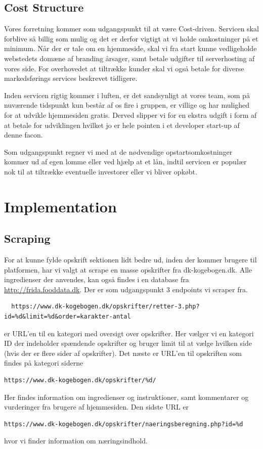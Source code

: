 \documentclass[a4paper,]{article}
\begin{document}
\subsection{Cost Structure}
Vores forretning kommer som udgangspunkt til at være Cost-driven. Servicen skal forblive så billig som mulig og det er derfor vigtigt at vi holde omkostninger på et minimum. Når der er tale om en hjemmeside, skal vi fra start kunne vedligeholde webstedets domæne af branding årsager, samt betale udgifter til serverhosting af vores side. For overhovedet at tiltrække kunder skal vi også betale for diverse markedsførings services beskrevet tidligere. 

Inden servicen rigtig kommer i luften, er det sandsynligt at vores team, som på nuværende tidspunkt kun består af os fire i gruppen, er villige og har mulighed for at udvikle hjemmesiden gratis. Derved slipper vi for en ekstra udgift i form af at betale for udviklingen hvilket jo er hele pointen i et developer start-up af denne facon. 

Som udgangspunkt regner vi med at de nødvendige opstartsomkostninger kommer ud af egen lomme eller ved hjælp at et lån, indtil servicen er populær nok til at tiltrække eventuelle investorer eller vi bliver opkøbt. 


\newpage
\section{Implementation}

\subsection{Scraping}
For at kunne fylde opskrift sektionen lidt bedre ud, inden der kommer
brugere til platformen, har vi valgt at scrape en masse opskrifter fra
dk-kogebogen.dk. Alle ingredienser der anvendes, kan også findes i en
database fra \url{http://frida.fooddata.dk}. Der er som udgangspunkt 3 endpoints vi
scraper fra.
\begin{verbatim}
  https://www.dk-kogebogen.dk/opskrifter/retter-3.php?id=%d&limit=%d&order=karakter-antal
\end{verbatim}
er URL’en til en kategori med oversigt over opskrifter. Her vælger vi
en kategori ID der indeholder spændende opskrifter og bruger limit til
at vælge hvilken side (hvis der er flere sider af opskrifter).
Det næste er URL’en til opskriften som findes på kategori siderne
\begin{verbatim}
https://www.dk-kogebogen.dk/opskrifter/%d/
\end{verbatim}
Her findes
information om ingredienser og instruktioner, samt kommentarer og
vurderinger fra brugere af hjemmesiden.
Den sidste URL er
\begin{verbatim}
https://www.dk-kogebogen.dk/opskrifter/naeringsberegning.php?id=%d
\end{verbatim}
hvor vi finder information om næringsindhold.
\end{document}

